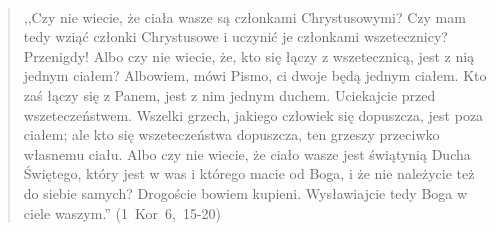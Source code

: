 \documentclass[10pt,a4paper,oneside]{article}
\begin{document}
\paragraph{}
\begin{quote}
,,Czy nie wiecie, że ciała wasze są członkami Chrystusowymi? Czy mam tedy wziąć członki Chrystusowe i uczynić je członkami wszetecznicy? Przenigdy! Albo czy nie wiecie, że, kto się łączy z wszetecznicą, jest z nią jednym ciałem? Albowiem, mówi Pismo, ci dwoje będą jednym ciałem. Kto zaś łączy się z Panem, jest z nim jednym duchem. Uciekajcie przed wszeteczeństwem. Wszelki grzech, jakiego człowiek się dopuszcza, jest poza ciałem; ale kto się wszeteczeństwa dopuszcza, ten grzeszy przeciwko własnemu ciału. Albo czy nie wiecie, że ciało wasze jest świątynią Ducha Świętego, który jest w was i którego macie od Boga, i że nie należycie też do siebie samych? Drogoście bowiem kupieni. Wysławiajcie tedy Boga w ciele waszym.'' \mbox{(1 Kor 6, 15-20)}
\end{quote}
\end{document}
